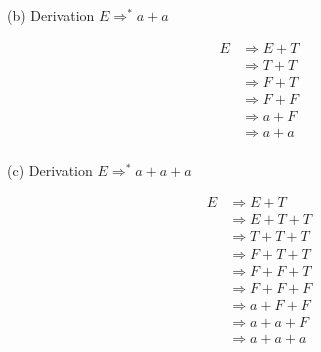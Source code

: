 \documentclass[12pt,letterpaper,final]{report}
\begin{document}
\pagebreak
\noindent(b) Derivation $E \Rightarrow^* a + a$

\medskip
\noindent
\begin{minipage}[t]{0.35\textwidth}
  \vspace{0pt}
  \begin{align*}
    E & \Rightarrow E + T \\
      & \Rightarrow T + T \\
      & \Rightarrow F + T \\
      & \Rightarrow F + F \\
      & \Rightarrow a + F \\
      & \Rightarrow a + a \\
  \end{align*}
\end{minipage}%
\hfill
\begin{minipage}[t]{0.6\textwidth}
  \vspace{0pt}
  \centering
\end{minipage}

\bigskip
\noindent(c) Derivation $E \Rightarrow^* a + a + a$

\medskip
\noindent
\begin{minipage}[t]{0.35\textwidth}
  \vspace{0pt}
  \begin{align*}
    E & \Rightarrow E + T     \\
      & \Rightarrow E + T + T \\
      & \Rightarrow T + T + T \\
      & \Rightarrow F + T + T \\
      & \Rightarrow F + F + T \\
      & \Rightarrow F + F + F \\
      & \Rightarrow a + F + F \\
      & \Rightarrow a + a + F \\
      & \Rightarrow a + a + a \\
  \end{align*}
\end{minipage}%
\hfill
\begin{minipage}[t]{0.6\textwidth}
  \vspace{0pt}
  \centering
\end{minipage}
\end{document}
